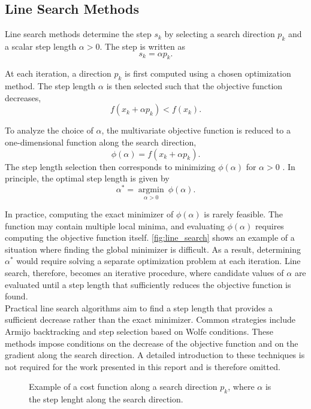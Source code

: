 \subsection{Line Search Methods}

Line search methods \cite{madsen2004} determine the step $s_k$ by selecting a search direction $p_k$ and a scalar step length $\alpha > 0$. The step is written as
\begin{equation*}
s_k = \alpha p_k.
\end{equation*}

At each iteration, a direction $p_k$ is first computed using a chosen optimization method. The step length $\alpha$ is then selected such that the objective function decreases,
\[
f(x_k + \alpha p_k) < f(x_k).
\]

To analyze the choice of $\alpha$, the multivariate objective function is reduced to a one-dimensional function along the search direction,
\begin{equation}
\phi(\alpha) = f(x_k + \alpha p_k).
\end{equation}
The step length selection then corresponds to minimizing $\phi(\alpha)$ for $\alpha > 0$ \cite{madsen2004}. In principle, the optimal step length is given by
\[
\alpha^\ast = \underset{\alpha > 0}{\operatorname{argmin}} \ \phi(\alpha).
\]

In practice, computing the exact minimizer of $\phi(\alpha)$ is rarely feasible. The function may contain multiple local minima, and evaluating $\phi(\alpha)$ requires computing the objective function itself. \autoref{fig:line_search} shows an example of a situation where finding the global minimizer is difficult. As a result, determining $\alpha^\ast$ would require solving a separate optimization problem at each iteration. Line search, therefore, becomes an iterative procedure, where candidate values of $\alpha$ are evaluated until a step length that sufficiently reduces the objective function is found.\\

Practical line search algorithms aim to find a step length that provides a sufficient decrease rather than the exact minimizer. Common strategies include Armijo backtracking and step selection based on Wolfe conditions. These methods impose conditions on the decrease of the objective function and on the gradient along the search direction. A detailed introduction to these techniques is not required for the work presented in this report and is therefore omitted.

\begin{figure}[ht]
    \centering
    
    \caption{Example of a cost function along a search direction $p_k$, where $\alpha$ is the step lenght along the search direction.}
    \label{fig:line_search}
\end{figure}

